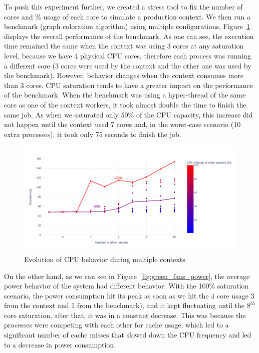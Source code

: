To push this experiment further, we created a stress tool to fix the number of cores and \% usage of each core to simulate a production context. 
We then run a benchmark (graph coloration algorithm) using multiple configurations.
Figure~\ref{fig:green_faas_duration} displays the overall performance of the benchmark.
As one can see, the execution time remained the same when the context was using 3 cores at any saturation level, because we have 4 physical CPU cores, therefore each process was running a different core (3 cores were used by the context and the other one was used by the benchmark).
However, behavior changes when the context consumes more than 3 cores.
CPU saturation tends to have a greater impact on the performance of the benchmark.
When the benchmark was using a hyper-thread of the same core as one of the context workers, it took almost double the time to finish the same job.
As when we saturated only 50\% of the CPU capacity, this increase did not happen until the context used 7 cores and, in the worst-case scenario (10 extra processes), it took only 75 seconds to finish the job.

\begin{figure}[!h]
      \centering
      \includegraphics[width=\linewidth]{chapters/green_faas_duration}
      \caption{Evolution of CPU behavior during multiple contexts }
      \label{fig:green_faas_duration}
\end{figure}

On the other hand, as we can see in Figure~\ref{fig:green_faas_power}, the average power behavior of the system had different behavior.
With the 100\% saturation scenario, the power consumption hit its peak as soon as we hit the 4 core usage 3 from the context and 1 from the benchmark), and it kept fluctuating until the $8^{th}$ core saturation, after that, it was in a constant decrease.
This was because the processes were competing with each other for cache usage, which led to a significant number of cache misses that slowed down the CPU frequency and led to a decrease in power consumption.

